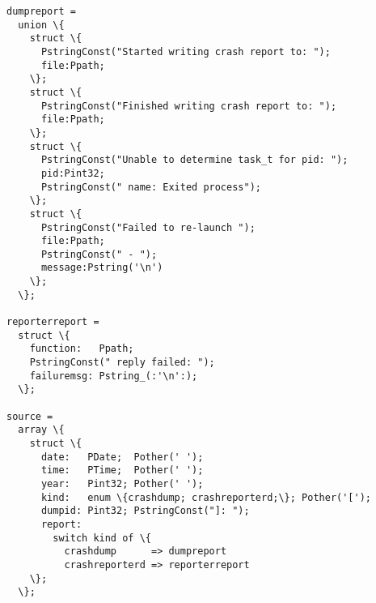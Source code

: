 \begin{figure*}
\begin{verbatim}
dumpreport =
  union \{
    struct \{
      PstringConst("Started writing crash report to: "); 
      file:Ppath;
    \};
    struct \{
      PstringConst("Finished writing crash report to: "); 
      file:Ppath;
    \};
    struct \{
      PstringConst("Unable to determine task_t for pid: "); 
      pid:Pint32; 
      PstringConst(" name: Exited process");
    \};
    struct \{
      PstringConst("Failed to re-launch "); 
      file:Ppath; 
      PstringConst(" - "); 
      message:Pstring('\n')
    \};
  \};

reporterreport =
  struct \{
    function:   Ppath; 
    PstringConst(" reply failed: ");
    failuremsg: Pstring_(:'\n':); 
  \};

source =
  array \{
    struct \{
      date:   PDate;  Pother(' ');
      time:   PTime;  Pother(' ');
      year:   Pint32; Pother(' ');
      kind:   enum \{crashdump; crashreporterd;\}; Pother('[');
      dumpid: Pint32; PstringConst("]: ");
      report: 
        switch kind of \{
          crashdump      => dumpreport
          crashreporterd => reporterreport
    \};
  \};
\end{verbatim}

\caption{Hand-written \ir{} Crashreporter description.  
  Note: needs to be checked for correctness.  This was written by hand by Dave
  using the syntax of the paper, guided by the pads golden description, but deviating
  slightly by nesting instead of expanding definitions and altering base types to fit the
  base types available in the IR.  I also replaced Peor with 'backslash-n'...
can't to produce a backslash in tex.}
\label{fig:crashreporter:ir}
\end{figure*}
